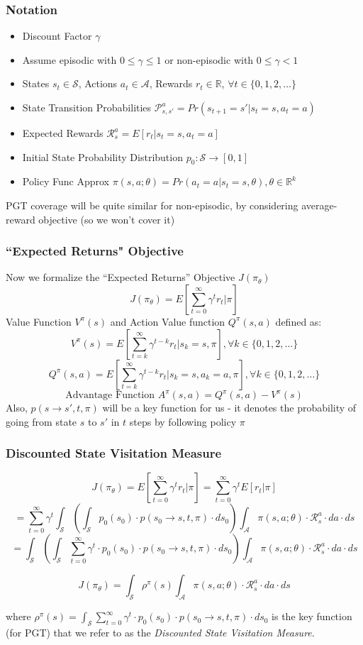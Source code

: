 \documentclass{beamer}
\begin{document}
\begin{frame}
\frametitle{Notation}
\pause
\begin{itemize}[<+->]
\item Discount Factor $\gamma$
\item Assume episodic with $0 \leq \gamma \leq1$ or non-episodic with $0 \leq \gamma < 1$
\item States $s_t \in \mathcal{S}$, Actions $a_t \in \mathcal{A}$, Rewards $r_t \in \mathbb{R}$, $\forall t \in \{0, 1, 2, \ldots\}$
\item State Transition Probabilities $\mathcal{P}_{s,s'}^a = Pr(s_{t+1}=s'|s_t=s,a_t=a)$
\item Expected Rewards $\mathcal{R}_s^a = E[r_t | s_t=s,a_t=a]$
\item Initial State Probability Distribution $p_0 : \mathcal{S} \rightarrow [0,1]$
\item Policy Func Approx $\pi(s,a;\theta) = Pr(a_t=a | s_t=s,\theta), \theta \in \mathbb{R}^k$
\end{itemize}
\pause
PGT coverage will be quite similar for non-episodic, by considering average-reward objective (so we won't cover it)
\end{frame}

\begin{frame}
\frametitle{``Expected Returns" Objective}
\pause
Now we formalize the ``Expected Returns'' Objective $J(\pi_{\theta})$
$$J(\pi_{\theta}) = E[\sum_{t=0}^\infty \gamma^t r_t|\pi]$$
\pause
Value Function $V^{\pi}(s)$ and Action Value function $Q^{\pi}(s,a)$ defined as:
$$V^{\pi}(s) = E[\sum_{t=k}^\infty \gamma^{t-k} r_t|s_k=s, \pi], \forall k \in \{0, 1, 2, \ldots\}$$
$$Q^{\pi}(s,a) = E[\sum_{t=k}^\infty \gamma^{t-k} r_t|s_k=s, a_k=a, \pi], \forall k \in \{0, 1, 2, \ldots\}$$
\pause
$$\mbox{Advantage Function } A^{\pi}(s,a) = Q^{\pi}(s,a) - V^{\pi}(s)$$
\pause
Also, $p(s \rightarrow s', t, \pi)$ will be a key function for us - it denotes the probability of going from state $s$ to $s'$ in $t$ steps by following policy $\pi$
\end{frame}

\begin{frame}
\frametitle{Discounted State Visitation Measure}
\pause
$$J(\pi_{\theta}) = E[\sum_{t=0}^\infty \gamma^t r_t|\pi] = \sum_{t=0}^\infty \gamma^t E[r_t|\pi]$$
\pause
$$ = \sum_{t=0}^\infty \gamma^t \int_{\mathcal{S}} (\int_{\mathcal{S}}  p_0(s_0) \cdot p(s_0 \rightarrow s, t, \pi) \cdot ds_0) \int_{\mathcal{A}} \pi(s,a; \theta) \cdot \mathcal{R}_s^a \cdot da \cdot ds$$
\pause
$$ =  \int_{\mathcal{S}} (\int_{\mathcal{S}}  \sum_{t=0}^\infty \gamma^t \cdot p_0(s_0) \cdot p(s_0 \rightarrow s, t, \pi) \cdot ds_0) \int_{\mathcal{A}} \pi(s,a; \theta) \cdot \mathcal{R}_s^a \cdot da \cdot ds$$
\pause
\begin{definition}
$$J(\pi_{\theta}) =  \int_{\mathcal{S}} \rho^{\pi}(s) \int_{\mathcal{A}} \pi(s,a; \theta) \cdot \mathcal{R}_s^a \cdot da \cdot ds$$
\end{definition}
\pause
where $\rho^{\pi}(s) = \int_{\mathcal{S}}  \sum_{t=0}^\infty \gamma^t \cdot p_0(s_0) \cdot p(s_0 \rightarrow s, t, \pi) \cdot ds_0$ is the key function (for PGT) that we refer to as the {\em Discounted State Visitation Measure}.
\end{frame}
\end{document}
